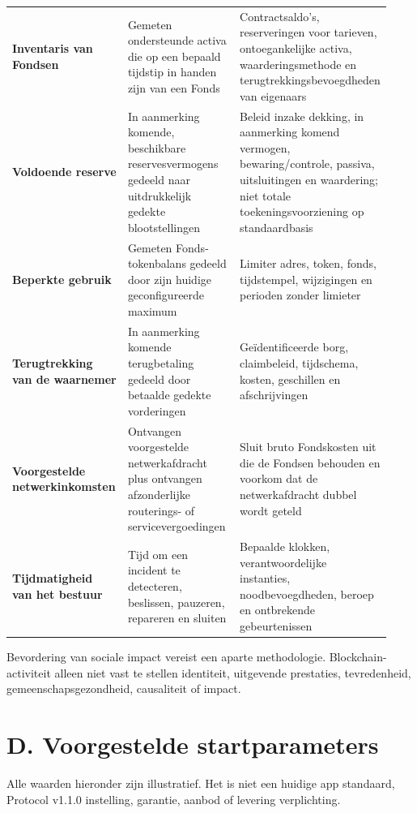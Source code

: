 \documentclass[11pt]{article}
\begin{document}
\begin{longtable}{P{0.31\linewidth} P{0.31\linewidth} P{0.31\linewidth}}
\textbf{Inventaris van Fondsen} & Gemeten ondersteunde activa die op een bepaald tijdstip in handen zijn van een Fonds & Contractsaldo's, reserveringen voor tarieven, ontoegankelijke activa, waarderingsmethode en terugtrekkingsbevoegdheden van eigenaars \\
\textbf{Voldoende reserve} & In aanmerking komende, beschikbare reservesvermogens gedeeld naar uitdrukkelijk gedekte blootstellingen & Beleid inzake dekking, in aanmerking komend vermogen, bewaring/controle, passiva, uitsluitingen en waardering; niet totale toekeningsvoorziening op standaardbasis \\
\textbf{Beperkte gebruik} & Gemeten Fonds-tokenbalans gedeeld door zijn huidige geconfigureerde maximum & Limiter adres, token, fonds, tijdstempel, wijzigingen en perioden zonder limieter \\
\textbf{Terugtrekking van de waarnemer} & In aanmerking komende terugbetaling gedeeld door betaalde gedekte vorderingen & Geïdentificeerde borg, claimbeleid, tijdschema, kosten, geschillen en afschrijvingen \\
\textbf{Voorgestelde netwerkinkomsten} & Ontvangen voorgestelde netwerkafdracht plus ontvangen afzonderlijke routerings- of servicevergoedingen & Sluit bruto Fondskosten uit die de Fondsen behouden en voorkom dat de netwerkafdracht dubbel wordt geteld \\
\textbf{Tijdmatigheid van het bestuur} & Tijd om een incident te detecteren, beslissen, pauzeren, repareren en sluiten & Bepaalde klokken, verantwoordelijke instanties, noodbevoegdheden, beroep en ontbrekende gebeurtenissen \\
\bottomrule
\end{longtable}

Bevordering van sociale impact vereist een aparte methodologie. Blockchain-activiteit alleen niet vast te stellen identiteit, uitgevende prestaties, tevredenheid, gemeenschapsgezondheid, causaliteit of impact.


\section*{D. Voorgestelde startparameters}

Alle waarden hieronder zijn illustratief. Het is niet een huidige app standaard, Protocol v1.1.0 instelling, garantie, aanbod of levering verplichting.
\end{document}

